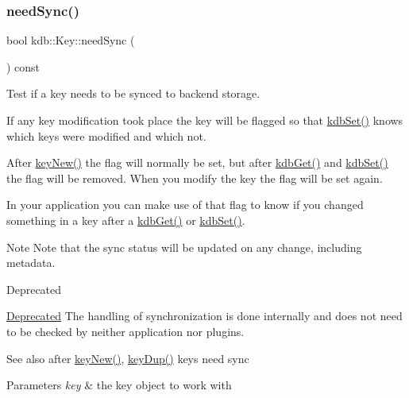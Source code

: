 \subsubsection{\texorpdfstring{need\+Sync()}{needSync()}}
{\footnotesize\ttfamily bool kdb\+::\+Key\+::need\+Sync (\begin{DoxyParamCaption}{ }\end{DoxyParamCaption}) const\hspace{0.3cm}{\ttfamily [inline]}}



Test if a key needs to be synced to backend storage. 

If any key modification took place the key will be flagged so that \hyperlink{group__kdb_ga11436b058408f83d303ca5e996832bcf}{kdb\+Set()} knows which keys were modified and which not.

After \hyperlink{group__key_gad23c65b44bf48d773759e1f9a4d43b89}{key\+New()} the flag will normally be set, but after \hyperlink{group__kdb_ga28e385fd9cb7ccfe0b2f1ed2f62453a1}{kdb\+Get()} and \hyperlink{group__kdb_ga11436b058408f83d303ca5e996832bcf}{kdb\+Set()} the flag will be removed. When you modify the key the flag will be set again.

In your application you can make use of that flag to know if you changed something in a key after a \hyperlink{group__kdb_ga28e385fd9cb7ccfe0b2f1ed2f62453a1}{kdb\+Get()} or \hyperlink{group__kdb_ga11436b058408f83d303ca5e996832bcf}{kdb\+Set()}.

\begin{DoxyNote}{Note}
Note that the sync status will be updated on any change, including metadata.
\end{DoxyNote}
\begin{DoxyRefDesc}{Deprecated}
\item[\hyperlink{deprecated__deprecated000012}{Deprecated}]The handling of synchronization is done internally and does not need to be checked by neither application nor plugins.\end{DoxyRefDesc}


\begin{DoxySeeAlso}{See also}
after \hyperlink{group__key_gad23c65b44bf48d773759e1f9a4d43b89}{key\+New()}, \hyperlink{group__key_gae6ec6a60cc4b8c1463fa08623d056ce3}{key\+Dup()} keys need sync
\end{DoxySeeAlso}

\begin{DoxyParams}{Parameters}
{\em key} & the key object to work with \\
\hline
\end{DoxyParams}

